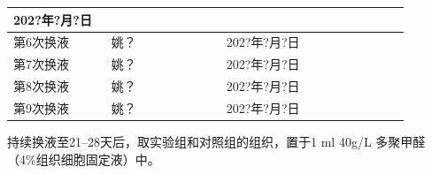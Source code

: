 \documentclass[UTF8,10pt,a4paper,fontset=fandol]{ctexart}
\newcommand{\fieldvalue}[1]{#1}
\newcommand{\handwritten}[1]{#1}
\begin{document}
\begin{tabular}{|p{0.23\linewidth}|p{0.27\linewidth}|p{0.23\linewidth}|p{0.20\linewidth}|}
\fieldvalue{\handwritten{202?年?月?日}} &
\\ \hline
第6次换液 &
\fieldvalue{\handwritten{姚？}} &
\fieldvalue{\handwritten{202?年?月?日}} &
\\ \hline
第7次换液 &
\fieldvalue{\handwritten{姚？}} &
\fieldvalue{\handwritten{202?年?月?日}} &
\\ \hline
第8次换液 &
\fieldvalue{\handwritten{姚？}} &
\fieldvalue{\handwritten{202?年?月?日}} &
\\ \hline
第9次换液 &
\fieldvalue{\handwritten{姚？}} &
\fieldvalue{\handwritten{202?年?月?日}} &
\\ \hline
\end{tabular}

\vspace{2mm}

持续换液至21--28天后，取实验组和对照组的组织，置于1 ml 40g/L 多聚甲醛（4\%组织细胞固定液）中。
\end{document}
